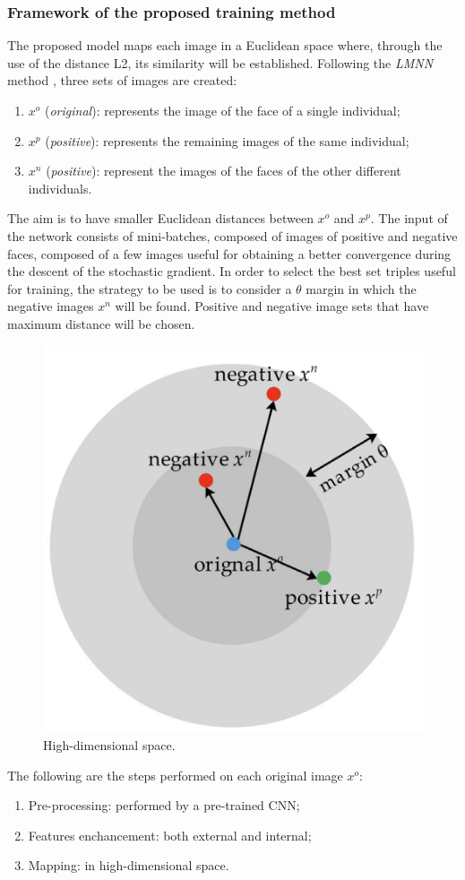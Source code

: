 \subsubsection{Framework of the proposed training method}
The proposed model maps each image in a Euclidean space where, through 
the use of the distance L2, its similarity will be established. Following the 
\emph{LMNN} method \cite{0902694039}, three sets of images are created:
\begin{enumerate}
    \item $x^o$ (\emph{original}): represents the image of the face of a single individual;
    \item $x^p$ (\emph{positive}): represents the remaining images of the same individual;
    \item $x^n$ (\emph{positive}): represent the images of the faces of the other different 
    individuals.
\end{enumerate}
The aim is to have smaller Euclidean distances between $x^o$ and $x^p$. The 
input of the network consists of mini-batches, composed of images of positive 
and negative faces, composed of a few images useful for obtaining a better 
convergence during the descent of the stochastic gradient. In order to select 
the best set triples useful for training, the strategy to be used is to consider 
a $\theta$ margin in which the negative images $x^n$  will be found. Positive and 
negative image sets that have maximum distance will be chosen. 
\begin{figure}[h!]
    \centering
    \includegraphics[width = 0.4\linewidth]{images/paper9/SET.png}
    \centering
    \caption{High-dimensional space.}
    \label{fig:HDS}
\end{figure}

The following are the steps performed on each original image $x^o$:
\begin{enumerate}
    \item Pre-processing: performed by a pre-trained CNN;
    \item Features enchancement: both external and internal;
    \item Mapping: in high-dimensional space.
\end{enumerate}

